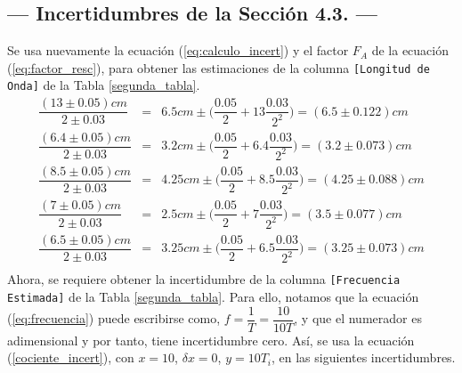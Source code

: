 \documentclass[12pt,a4paper]{article}
\begin{document}
\subsection{--- Incertidumbres de la Sección 4.3. ---} %
\label{incertidumbres_4_3}
Se usa nuevamente la ecuación (\ref{eq:calculo_incert}) y el factor \(F_A\) de la ecuación (\ref{eq:factor_resc}), para obtener las estimaciones de la columna \texttt{[Longitud de Onda]} de la Tabla \ref{segunda_tabla}. 
\[
	\begin{array}{rcl}
		\dfrac{(13 \pm 0.05)cm}{2 \pm 0.03} & = & 6.5cm  \pm \Bigg(\dfrac{0.05}{2}  + 13 \dfrac{0.03}{2^2}\Bigg) =    (6.5 \pm 0.122)cm \\[6mm]
		 \dfrac{(6.4 \pm 0.05)cm}{2 \pm 0.03} & = & 3.2cm  \pm \Bigg(\dfrac{0.05}{2} + 6.4\dfrac{0.03}{2^2}\Bigg) =   (3.2 \pm 0.073)cm \\[6mm]
		 \dfrac{(8.5 \pm 0.05)cm}{2 \pm 0.03} & = & 4.25cm \pm \Bigg(\dfrac{0.05}{2} + 8.5\dfrac{0.03}{2^2}\Bigg) =  (4.25 \pm 0.088)cm \\[6mm]
			 \dfrac{(7 \pm 0.05)cm}  {2 \pm 0.03} & = & 2.5cm  \pm \Bigg(\dfrac{0.05}{2}   + 7  \dfrac{0.03}{2^2}\Bigg)=(3.5 \pm 0.077)cm \\[6mm]
		 \dfrac{(6.5 \pm 0.05)cm}{2 \pm 0.03} & = & 3.25cm \pm \Bigg(\dfrac{0.05}{2} + 6.5\dfrac{0.03}{2^2}\Bigg) =  (3.25 \pm 0.073)cm \\[6mm]
	\end{array}
\]
Ahora, se requiere obtener la incertidumbre de la columna \texttt{[Frecuencia Estimada]} de la Tabla \ref{segunda_tabla}. Para ello, notamos que la ecuación (\ref{eq:frecuencia}) puede escribirse como, \(f= \dfrac{1}{T} = \dfrac{10}{10T}\), y que el numerador es adimensional y por tanto, tiene incertidumbre cero. Así, se usa la ecuación (\ref{cociente_incert}), con \(x=10\), \(\delta x=0\), \(y=10T_i\), en las siguientes incertidumbres.
\end{document}
